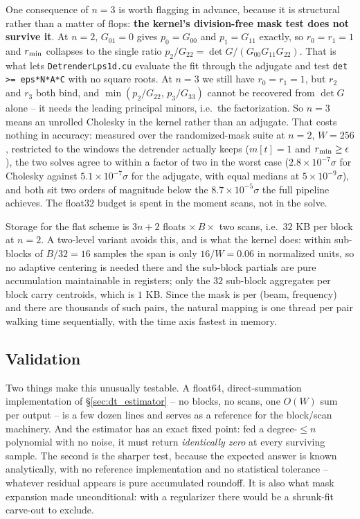 \documentclass{article}
\numberwithin{equation}{section}   %
\begin{document}
One consequence of $n=3$ is worth flagging in advance, because it is structural rather than a matter of
flops: {\bf the kernel's division-free mask test does not survive it}.  At $n=2$, $G_{01} = 0$ gives
$p_0 = G_{00}$ and $p_1 = G_{11}$ exactly, so $r_0 = r_1 = 1$ and $r_{\rm min}$ collapses to the single ratio
$p_2/G_{22} = \det G/(G_{00}G_{11}G_{22})$.  That is what lets {\tt DetrenderLps1d.cu} evaluate the fit through
the adjugate and test {\tt det >= eps*N*A*C} with no square roots.  At $n=3$ we still have $r_0 = r_1 = 1$,
but $r_2$ and $r_3$ both bind, and $\min(p_2/G_{22},\, p_3/G_{33})$ cannot be recovered from $\det G$ alone --
it needs the leading principal minors, i.e.~the factorization.  So $n=3$ means an unrolled Cholesky in the
kernel rather than an adjugate.  That costs nothing in accuracy: measured over the randomized-mask suite at
$n=2$, $W=256$, restricted to the windows the detrender actually keeps ($m[t]=1$ and $r_{\rm min} \ge
\epsilon$), the two solves agree to within a factor of two in the worst case ($2.8\times10^{-7}\sigma$ for
Cholesky against $5.1\times10^{-7}\sigma$ for the adjugate, with equal medians at $5\times10^{-9}\sigma$),
and both sit two orders of magnitude below the $8.7\times10^{-5}\sigma$ the full pipeline achieves.  The
float32 budget is spent in the moment scans, not in the solve.

Storage for the flat scheme is $3n{+}2$ floats $\times\, B \times$ two scans, i.e.~$32$ KB per block at $n=2$.
A two-level variant avoids this, and is what the kernel does: within sub-blocks of $B/32 = 16$ samples the
span is only $16/W = 0.06$ in normalized units, so no adaptive centering is needed there and the sub-block
partials are pure accumulation maintainable in registers; only the $32$ sub-block aggregates per block carry
centroids, which is $1$ KB.
Since the mask is per (beam, frequency) and there are thousands of such pairs, the natural mapping is one
thread per pair walking time sequentially, with the time axis fastest in memory.

\subsection{Validation}
\label{sec:dt_validation}

Two things make this unusually testable.  A float64, direct-summation implementation of
\S\ref{sec:dt_estimator} -- no blocks, no scans, one $O(W)$ sum per output -- is a few dozen lines and serves as
a reference for the block/scan machinery.  And the estimator has an exact fixed point: fed a degree-$\le n$
polynomial with no noise, it must return {\em identically zero} at every surviving sample.  The second is the
sharper test, because the expected answer is known analytically, with no reference implementation and no
statistical tolerance -- whatever residual appears is pure accumulated roundoff.  It is also what mask expansion
made unconditional: with a regularizer there would be a shrunk-fit carve-out to exclude.
\end{document}
